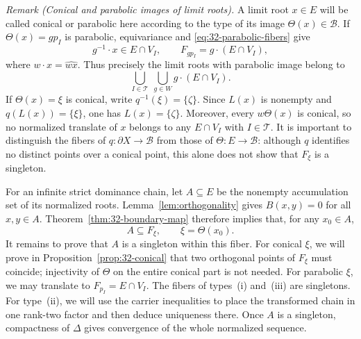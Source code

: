 \documentclass[11pt,reqno]{amsart}
\theoremstyle{plain}
\theoremstyle{definition}
\theoremstyle{remark}
\numberwithin{equation}{section}
\begin{document}
\medskip
\noindent\textit{Remark (Conical and parabolic images of limit roots).}
A limit root $x\in E$ will be called conical or parabolic here according
to the type of its image $\Theta(x)\in\mathcal B$.
If $\Theta(x)=g p_I$ is parabolic, equivariance and
\eqref{eq:32-parabolic-fibers} give
\[
    g^{-1}\cdot x\in E\cap V_I,
    \qquad
    F_{g p_I}=g\cdot(E\cap V_I),
\]
where $w\cdot x=\widehat{wx}$.
Thus precisely the limit roots with parabolic image belong to
\[
    \bigcup_{I\in\mathcal T}\ \bigcup_{g\in W}g\cdot(E\cap V_I).
\]
If $\Theta(x)=\xi$ is conical, write $q^{-1}(\xi)=\{\zeta\}$.
Since $L(x)$ is nonempty and $q(L(x))=\{\xi\}$, one has
$L(x)=\{\zeta\}$.
Moreover, every $w\Theta(x)$ is conical, so no normalized translate
of $x$ belongs to any $E\cap V_I$ with $I\in\mathcal T$.
It is important to distinguish the fibers of
$q:\partial X\to\mathcal B$ from those of $\Theta:E\to\mathcal B$:
although $q$ identifies no distinct points over a conical point,
this alone does not show that $F_\xi$ is a singleton.

\medskip
For an infinite strict dominance chain, let $A\subseteq E$ be the
nonempty accumulation set of its normalized roots.
Lemma~\ref{lem:orthogonality} gives $B(x,y)=0$ for all $x,y\in A$.
Theorem~\ref{thm:32-boundary-map} therefore implies that, for any
$x_0\in A$,
\[
    A\subseteq F_\xi,\qquad \xi=\Theta(x_0).
\]
It remains to prove that $A$ is a singleton within this fiber.
For conical $\xi$, we will prove in Proposition~\ref{prop:32-conical}
that two orthogonal points of $F_\xi$ must coincide; injectivity of
$\Theta$ on the entire conical part is not needed.
For parabolic $\xi$, we may translate to $F_{p_I}=E\cap V_I$.
The fibers of types~\textup{(i)} and~\textup{(iii)} are singletons.
For type~\textup{(ii)}, we will use the carrier inequalities to place
the transformed chain in one rank-two factor and then deduce
uniqueness there. Once $A$ is a singleton, compactness of $\Delta$
gives convergence of the whole normalized sequence.
\end{document}
